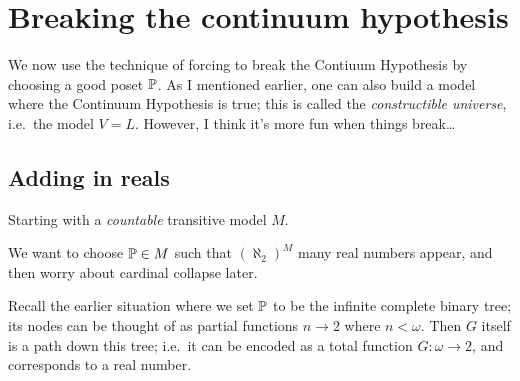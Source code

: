 \chapter{Breaking the continuum hypothesis}
We now use the technique of forcing to break the Contiuum Hypothesis by choosing a good poset $\mathbb P$.
As I mentioned earlier, one can also build a model where the Continuum Hypothesis is true;
this is called the \emph{constructible universe}, i.e.\ the model $V=L$.
However, I think it's more fun when things break\dots

%
%

\section{Adding in reals}
Starting with a \emph{countable} transitive model $M$.

We want to choose $\mathbb P \in M$ such that $(\aleph_2)^M$ many real numbers appear,
and then worry about cardinal collapse later.

Recall the earlier situation where we set $\mathbb P$ to be the infinite complete binary tree; its nodes can be thought of as partial functions $n \to 2$ where $n < \omega$.
Then $G$ itself is a path down this tree; i.e.\ it can be encoded as a total function $G : \omega \to 2$,
and corresponds to a real number.

